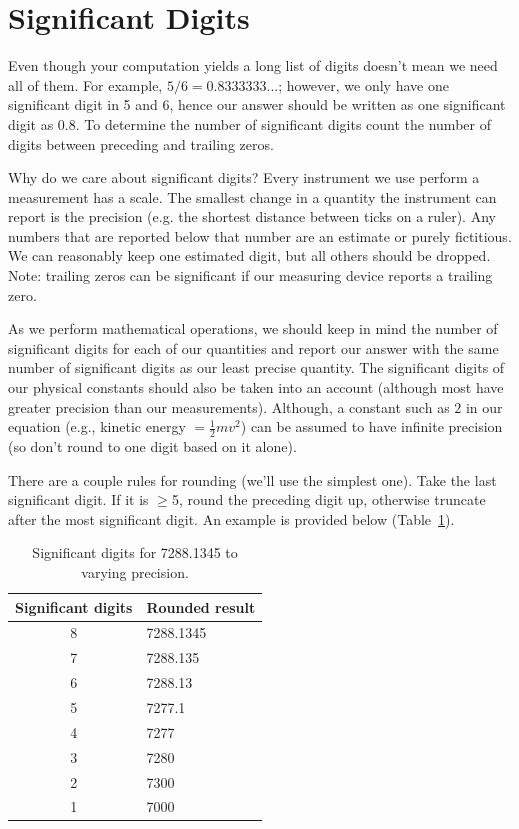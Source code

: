 \section{Significant Digits}

Even though your computation yields a long list of digits doesn't mean we need
all of them.  For example, $5/6 = 0.8333333...$; however, we only have one
significant digit in 5 and 6, hence our answer should be written as one
significant digit as 0.8.  To determine the number of significant digits count
the number of digits between preceding and trailing zeros.

Why do we care about significant digits?  Every instrument we use perform a
measurement has a scale.  The smallest change in a quantity the instrument can
report is the precision (e.g. the shortest distance between ticks on a ruler).
Any numbers that are reported below that number are an estimate or purely
fictitious.  We can reasonably keep one estimated digit, but all others should
be dropped.  Note: trailing zeros can be significant if our measuring device
reports a trailing zero.

As we perform mathematical operations, we should keep in mind the number of
significant digits for each of our quantities and report our answer with the
same number of significant digits as our least precise quantity.  The
significant digits of our physical constants should also be taken into an
account (although most have greater precision than our measurements).  Although,
a constant such as $2$ in our equation (e.g., kinetic energy $= \frac{1}{2} m
v^2$) can be assumed to have infinite precision (so don't round to one digit
based on it alone).

There are a couple rules for rounding (we'll use the simplest one).  Take the
last significant digit.  If it is $\geq$5, round the preceding digit up,
otherwise truncate after the most significant digit.  An example is provided
below (Table~\ref{tab:sigdig}).
\begin{table}[hbt]
    \centering
    \caption{Significant digits for 7288.1345 to varying precision.}
    \label{tab:sigdig}
    \begin{tabular}{cl}
        \toprule
        \textbf{Significant digits} & \textbf{Rounded result} \\
        \midrule
        8 & 7288.1345 \\
        7 & 7288.135 \\
        6 & 7288.13 \\
        5 & 7277.1 \\
        4 & 7277 \\
        3 & 7280 \\
        2 & 7300 \\
        1 & 7000 \\
        \bottomrule
    \end{tabular}
\end{table}

